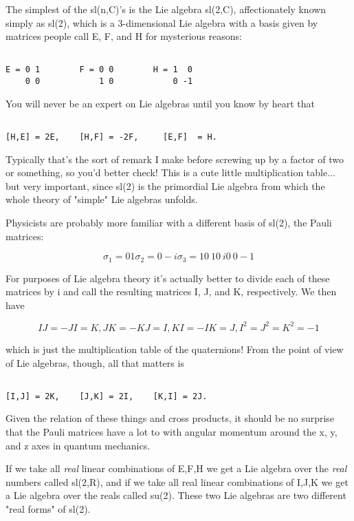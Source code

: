 The simplest of the sl(n,C)'s is the Lie algebra sl(2,C), affectionately
known simply as sl(2), which is a 3-dimensional Lie algebra with a
basis given by matrices people call E, F, and H for mysterious reasons:


\begin{verbatim}

E = 0 1        F = 0 0        H = 1  0 
    0 0            1 0            0 -1
\end{verbatim}
    

You will never be an expert on Lie algebras until you know by heart that


\begin{verbatim}

[H,E] = 2E,    [H,F] = -2F,     [E,F]  = H.
\end{verbatim}
    

Typically that's the sort of remark I make before screwing up by a
factor of two or something, so you'd better check!  This is a
cute little multiplication table... but very important, since sl(2) is
the primordial Lie algebra from which the whole theory of "simple" Lie
algebras unfolds.   

Physicists are probably more familiar with a different basis of sl(2),
the Pauli matrices:


$$

\sigma _{1} = 0 1       \sigma _{2} = 0 -i       \sigma _{3} = 1  0 
_{\ }    1 0    _{\ }       i  0  _{\ }         0 -1
$$
    

For purposes of Lie algebra theory it's actually better to divide each of
these matrices by i and call the resulting matrices I, J, and K,
respectively.  We then have


$$

IJ = -JI = K,	JK = -KJ = I,    KI = -IK = J,   I^{2} = J^{2} = K^{2} = -1
$$
    

which is just the multiplication table of the quaternions!  From the
point of view of Lie algebras, though, all that matters is


\begin{verbatim}

[I,J] = 2K,    [J,K] = 2I,    [K,I] = 2J.
\end{verbatim}
    

Given the relation of these things and cross products, it should be no
surprise that the Pauli matrices have a lot to with angular momentum
around the x, y, and z axes in quantum mechanics.   

If we take all \emph{real} linear combinations of E,F,H we get a Lie algebra
over the \emph{real} numbers called sl(2,R), and if we take all real linear
combinations of I,J,K we get a Lie algebra over the reals called
su(2).  These two Lie algebras are two different "real forms" of sl(2).  

